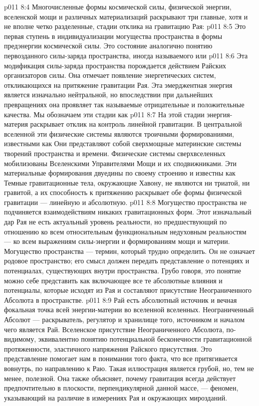 \vs p011 8:4 \pc Многочисленные формы космической силы, физической энергии, вселенской мощи и различных материализаций раскрывают три главные, хотя и не вполне четко разделенные, стадии отклика на гравитацию Рая:
\vs p011 8:5 \bibnobreakspace {} Это первая ступень в индивидуализации могущества пространства в формы предэнергии космической силы. Это состояние аналогично понятию первозданного силы\hyp{}заряда пространства, иногда называемого  или 
\vs p011 8:6 \pc {}\bibnobreakspace {} Эта модификация силы\hyp{}заряда пространства порождается действием Райских организаторов силы. Она отмечает появление энергетических систем, откликающихся на притяжение гравитации Рая. Эта эмерджентная энергия является изначально нейтральной, но впоследствии при дальнейших превращениях она проявляет так называемые отрицательные и положительные качества. Мы обозначаем эти стадии как 
\vs p011 8:7 \pc {}\bibnobreakspace {} На этой стадии энергия\hyp{}материя раскрывает отклик на контроль линейной гравитации. В центральной вселенной эти физические системы являются троичными формированиями, известными как  Они представляют собой сверхмощные материнские системы творений пространства и времени. Физические системы сверхвселенных мобилизованы Вселенскими Управителями Мощи и их сподвижниками. Эти материальные формирования двуедины по своему строению и известны как  Темные гравитационные тела, окружающие Хавону, не являются ни триатой, ни гравитой, а их способность к притяжению раскрывает обе формы физической гравитации --- линейную и абсолютную.
\vs p011 8:8 \pc Могущество пространства не подчиняется взаимодействиям никаких гравитационных форм. Этот изначальный дар Рая не есть актуальный уровень реальности, но предшествующий по отношению ко всем относительным функциональным недуховным реальностям --- ко всем выражениям силы\hyp{}энергии и формированиям мощи и материи. Могущество пространства --- термин, который трудно определить. Он не означает родовое пространство; его смысл должен передать представление о потенциях и потенциалах, существующих внутри пространства. Грубо говоря, это понятие можно себе представить как включающее все те абсолютные влияния и потенциалы, которые исходят из Рая и составляют присутствие Неограниченного Абсолюта в пространстве.
\vs p011 8:9 Рай есть абсолютный источник и вечная фокальная точка всей энергии\hyp{}материи во вселенной вселенных. Неограниченный Абсолют --- раскрыватель, регулятор и хранилище того, источником и началом чего является Рай. Вселенское присутствие Неограниченного Абсолюта, по\hyp{}видимому, эквивалентно понятию потенциальной бесконечности гравитационной протяженности, эластичного напряжения Райского присутствия. Это представление помогает нам в понимании того факта, что все притягивается вовнутрь, по направлению к Раю. Такая иллюстрация является грубой, но, тем не менее, полезной. Она также объясняет, почему гравитация всегда действует предпочтительно в плоскости, перпендикулярной данной массе, --- феномен, указывающий на различие в измерениях Рая и окружающих мирозданий.
